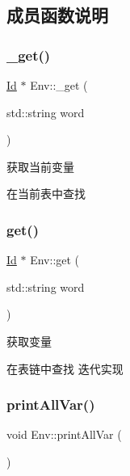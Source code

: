 \subsection{成员函数说明}
\mbox{\label{class_env_aca71253ff9d30153d0834a47cd35a351}} 
\subsubsection{\texorpdfstring{\+\_\+get()}{\_get()}}
{\footnotesize\ttfamily \hyperlink{class_id}{Id} $\ast$ Env\+::\+\_\+get (\begin{DoxyParamCaption}\item[{std\+::string}]{word }\end{DoxyParamCaption})\hspace{0.3cm}{\ttfamily [protected]}}



获取当前变量 

在当前表中查找 \mbox{\label{class_env_a59bbdcdb7af396f6fb6cbff2f828e62b}} 
\subsubsection{\texorpdfstring{get()}{get()}}
{\footnotesize\ttfamily \hyperlink{class_id}{Id} $\ast$ Env\+::get (\begin{DoxyParamCaption}\item[{std\+::string}]{word }\end{DoxyParamCaption})}



获取变量 

在表链中查找 迭代实现 \mbox{\label{class_env_a8ba6704ef2039c2329569efc99f1e087}} 
\subsubsection{\texorpdfstring{print\+All\+Var()}{printAllVar()}}
{\footnotesize\ttfamily void Env\+::print\+All\+Var (\begin{DoxyParamCaption}{ }\end{DoxyParamCaption})}



